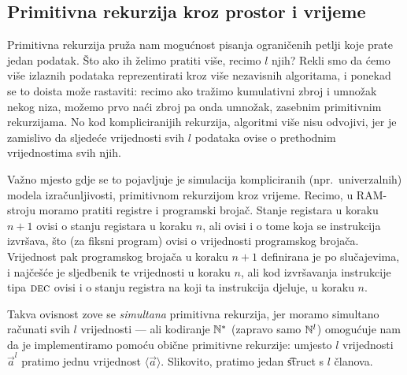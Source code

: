 \subsection{Primitivna rekurzija kroz prostor i vrijeme}

Primitivna rekurzija pruža nam mogućnost pisanja ograničenih petlji koje prate jedan podatak. Što ako ih želimo pratiti više, recimo $l$ njih? Rekli smo da ćemo više izlaznih podataka reprezentirati kroz više nezavisnih algoritama, i ponekad se to doista može rastaviti: recimo ako tražimo kumulativni zbroj i umnožak nekog niza, možemo prvo naći zbroj pa onda umnožak, zasebnim primitivnim rekurzijama. No kod kompliciranijih rekurzija, algoritmi više nisu odvojivi, jer je zamislivo da sljedeće vrijednosti svih $l$ podataka ovise o prethodnim vrijednostima svih njih.

Važno mjesto gdje se to pojavljuje je simulacija kompliciranih (npr.\ univerzalnih) modela izračunljivosti, primitivnom rekurzijom kroz vrijeme. Recimo, u RAM-stroju moramo pratiti registre i programski brojač. Stanje registara u koraku $n+1$ ovisi o stanju registara u koraku $n$, ali ovisi i o tome koja se instrukcija izvršava, što (za fiksni program) ovisi o vrijednosti programskog brojača. Vrijednost pak programskog brojača u koraku $n+1$ definirana je po slučajevima, i najčešće je sljedbenik te vrijednosti u koraku $n$, ali kod izvršavanja instrukcije tipa $\textsc{dec}$ ovisi i o stanju registra na koji ta instrukcija djeluje, u koraku $n$.

Takva ovisnost zove se \emph{simultana} primitivna rekurzija, jer moramo simultano ra\-ču\-na\-ti svih $l$ vrijednosti --- ali kodiranje ${\mathbb N}^*$ (zapravo samo ${\mathbb N}^l$) omogućuje nam da je implementiramo pomoću obične primitivne rekurzije: umjesto $l$ vrijednosti $\vec a^l$ pratimo jednu vrijednost $\langle\vec a\rangle$. Slikovito, pratimo jedan \t{struct} s $l$ članova.

